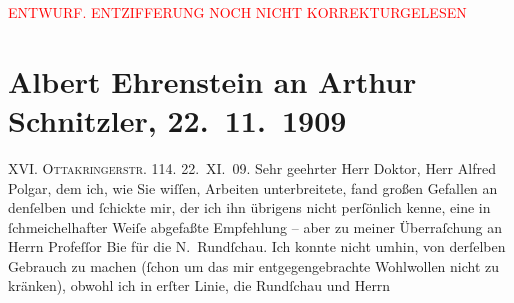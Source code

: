
\begin{center}
            \textcolor{red}{ENTWURF. ENTZIFFERUNG NOCH NICHT KORREKTURGELESEN}
                      \end{center}
            
               \section[Albert Ehrenstein an Arthur Schnitzler, 22. 11. 1909]{ Albert Ehrenstein an Arthur Schnitzler, 22. 11. 1909}\nopagebreak{}\rehead{ }\begin{ledgroupsized}[t]{13cm}\normalsize\beginnumbering{} \toendnotes[C]{\smallbreak\pagebreak[2]} 
\toendnotes[C]{\smallbreak}\pstart
           \noindent{}{\pb}XVI. \textsc{Ottakringerstr.} 114.
                        \hfill 22. XI. 09.
                        \pend
           \pstart{}Sehr geehrter Herr Doktor,\pend\pstart
           Herr Alfred Polgar, dem ich, wie Sie wiſſen,
                    Arbeiten unterbreitete, fand großen Gefallen an denſelben und ſchickte mir, der
                    ich ihn übrigens nicht perſönlich kenne, eine in ſchmeichelhafter Weiſe
                    abgefaßte Empfehlung – aber zu meiner Überraſchung an Herrn Profeſſor Bie für die N. Rundſchau. Ich konnte nicht umhin, von derſelben Gebrauch zu machen
                    (ſchon um das mir entgegengebrachte Wohlwollen nicht zu kränken), obwohl ich in
                    erſter Linie, die Rundſchau und Herrn

\end{ledgroupsized}
